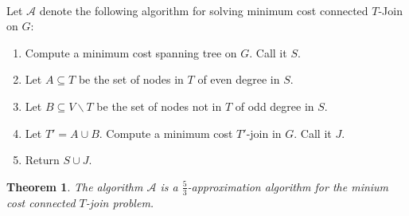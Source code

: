 \documentclass[letterpaper,12pt,oneside,onecolumn]{article}
\newcommand{\cA}{\mathcal{A}} \newcommand{\cB}{\mathcal{B}}
\newtheorem{theorem}[fact]{Theorem}
\begin{document}
\paragraph{}
Let $\cA$ denote the following algorithm for solving minimum cost connected $T$-Join on $G$:
\begin{enumerate}
\item Compute a minimum cost spanning tree on $G$. Call it $S$.
\item Let $A \subseteq T$ be the set of nodes in $T$ of even degree in $S$.
\item Let $B \subseteq V\backslash T$ be the set of nodes not in $T$ of odd degree in $S$.
\item Let $T' = A \cup B$. Compute a minimum cost $T'$-join in $G$. Call it $J$.
\item Return $S \cup J$.
\end{enumerate}
\begin{theorem}
The algorithm $\cA$ is a $\frac{5}{3}$-approximation algorithm for the minium cost connected $T$-join problem.
\end{theorem}
\end{document}
